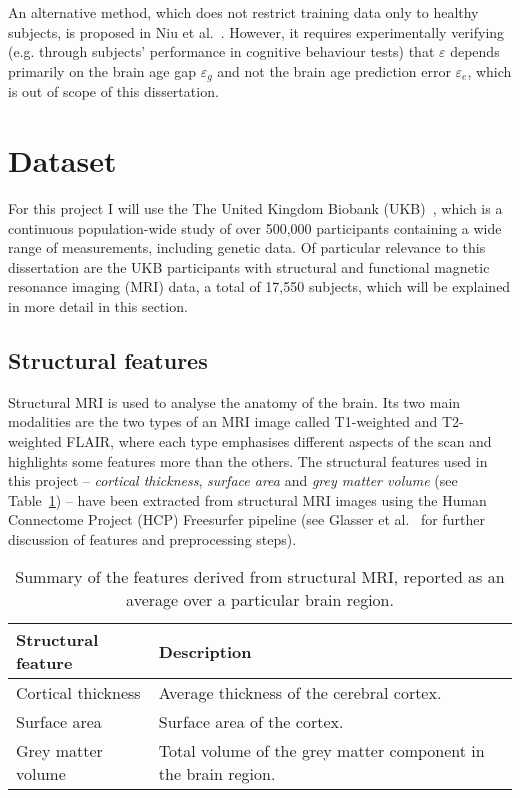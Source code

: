 An alternative method, which does not restrict training data only to healthy subjects, is proposed in Niu et al.~\cite{niu2019improved}. However, it requires experimentally verifying (e.g. through subjects' performance in cognitive behaviour tests) that $\varepsilon$ depends primarily on the brain age gap $\varepsilon_g$ and not the brain age prediction error $\varepsilon_e$, which is out of scope of this dissertation.

\section{Dataset}
\label{dataset}

For this project I will use the The United Kingdom Biobank (UKB)~\cite{sudlow2015uk}, which is a continuous population-wide study of over 500,000 participants containing a wide range of measurements, including genetic data. Of particular relevance to this dissertation are the UKB participants with structural and functional magnetic resonance imaging (MRI) data, a total of 17,550 subjects, which will be explained in more detail in this section. 

\subsection{Structural features}

Structural MRI is used to analyse the anatomy of the brain. Its two main modalities are the two types of an MRI image called T1-weighted and T2-weighted FLAIR, where each type emphasises different aspects of the scan and highlights some features more than the others. The structural features used in this project – \textit{cortical thickness}, \textit{surface area} and \textit{grey matter volume} (see Table~\ref{table:structural-features}) – have been extracted from structural MRI images using the Human Connectome Project (HCP) Freesurfer pipeline (see Glasser et al.~\cite{glasser2013minimal} for further discussion of features and preprocessing steps). 

\begin{table}[]
\centering
    \caption{Summary of the features derived from structural MRI, reported as an average over a particular brain region.}\label{table:structural-features}
    
    \begin{tabular}{lp{11cm}}
        \hline
    \textbf{Structural feature}            & \textbf{Description} \\ \hline
    Cortical thickness &  Average thickness of the cerebral cortex. \\
    Surface area       &  Surface area of the cortex. \\
    Grey matter volume &  Total volume of the grey matter component in the brain region. \\ \hline
    \end{tabular}
\end{table}


